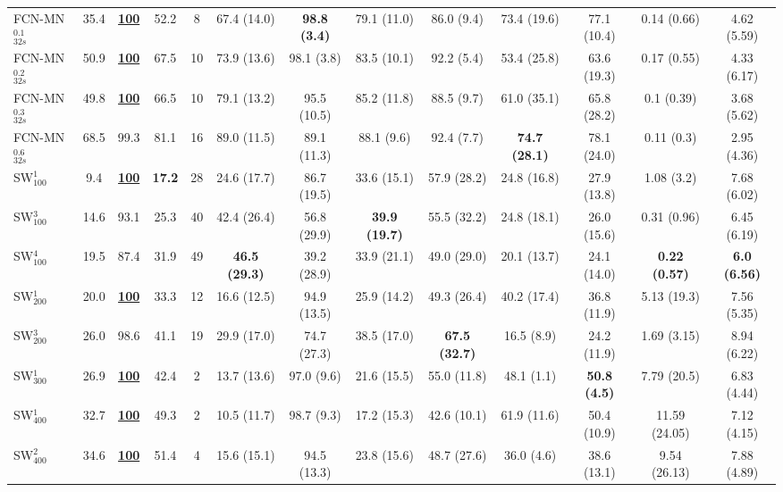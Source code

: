 \documentclass[a4paper,authoryear,review]{elsarticle}
\begin{document}
\begin{table}[]
\begin{adjustbox}{angle=90}
{\begin{tabular}{lcccccccccccc}
					FCN-MN$_{32s}^{0.1}$ & 35.4 & {\ul \textbf{100}} & 52.2 & 8 & 67.4 (14.0) & \textbf{98.8 (3.4)} & 79.1 (11.0) & 86.0 (9.4) & 73.4 (19.6) & 77.1 (10.4) & 0.14 (0.66) & 4.62 (5.59) \\
					FCN-MN$_{32s}^{0.2}$ & 50.9 & {\ul \textbf{100}} & 67.5 & 10 & 73.9 (13.6) & 98.1 (3.8) & 83.5 (10.1) & 92.2 (5.4) & 53.4 (25.8) & 63.6 (19.3) & 0.17 (0.55) & 4.33 (6.17) \\
					FCN-MN$_{32s}^{0.3}$ & 49.8 & {\ul \textbf{100}} & 66.5 & 10 & 79.1 (13.2) & 95.5 (10.5) & 85.2 (11.8) & 88.5 (9.7) & 61.0 (35.1) & 65.8 (28.2) & 0.1 (0.39) & 3.68 (5.62) \\
					FCN-MN$_{32s}^{0.6}$ & 68.5 & 99.3 & 81.1 & 16 & 89.0 (11.5) & 89.1 (11.3) & 88.1 (9.6) & 92.4 (7.7) & \textbf{74.7 (28.1)} & 78.1 (24.0) & 0.11 (0.3) & 2.95 (4.36) \\
					SW$_{100}^{1}$ & 9.4 & {\ul \textbf{100}} & \textbf{17.2} & 28 & 24.6 (17.7) & 86.7 (19.5) & 33.6 (15.1) & 57.9 (28.2) & 24.8 (16.8) & 27.9 (13.8) & 1.08 (3.2) & 7.68 (6.02) \\
					SW$_{100}^{3}$ & 14.6 & 93.1 & 25.3 & 40 & 42.4 (26.4) & 56.8 (29.9) & \textbf{39.9 (19.7)} & 55.5 (32.2) & 24.8 (18.1) & 26.0 (15.6) & 0.31 (0.96) & 6.45 (6.19) \\
					SW$_{100}^{4}$ & 19.5 & 87.4 & 31.9 & 49 & \textbf{46.5 (29.3)} & 39.2 (28.9) & 33.9 (21.1) & 49.0 (29.0) & 20.1 (13.7) & 24.1 (14.0) & \textbf{0.22 (0.57)} & \textbf{6.0 (6.56)} \\
					SW$_{200}^{1}$ & 20.0 & {\ul \textbf{100}} & 33.3 & 12 & 16.6 (12.5) & 94.9 (13.5) & 25.9 (14.2) & 49.3 (26.4) & 40.2 (17.4) & 36.8 (11.9) & 5.13 (19.3) & 7.56 (5.35) \\
					SW$_{200}^{3}$ & 26.0 & 98.6 & 41.1 & 19 & 29.9 (17.0) & 74.7 (27.3) & 38.5 (17.0) & \textbf{67.5 (32.7)} & 16.5 (8.9) & 24.2 (11.9) & 1.69 (3.15) & 8.94 (6.22) \\
					SW$_{300}^{1}$ & 26.9 & {\ul \textbf{100}} & 42.4 & 2 & 13.7 (13.6) & 97.0 (9.6) & 21.6 (15.5) & 55.0 (11.8) & 48.1 (1.1) & \textbf{50.8 (4.5)} & 7.79 (20.5) & 6.83 (4.44) \\
					SW$_{400}^{1}$ & 32.7 & {\ul \textbf{100}} & 49.3 & 2 & 10.5 (11.7) & 98.7 (9.3) & 17.2 (15.3) & 42.6 (10.1) & 61.9 (11.6) & 50.4 (10.9) & 11.59 (24.05) & 7.12 (4.15) \\
					SW$_{400}^{2}$ & 34.6 & {\ul \textbf{100}} & 51.4 & 4 & 15.6 (15.1) & 94.5 (13.3) & 23.8 (15.6) & 48.7 (27.6) & 36.0 (4.6) & 38.6 (13.1) & 9.54 (26.13) & 7.88 (4.89) \\

\end{tabular}}
\end{adjustbox}
\end{table}
\end{document}
